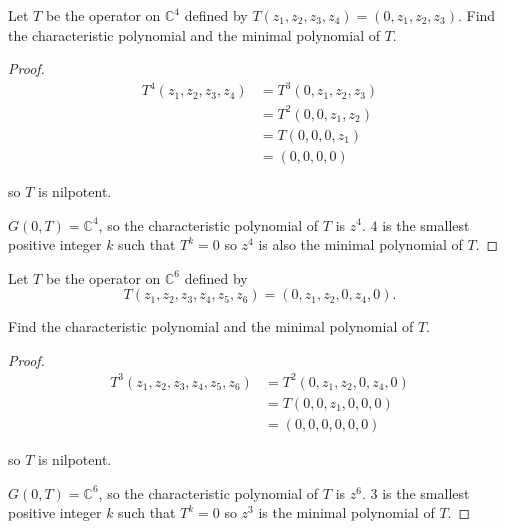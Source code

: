 \begin{exercise}\label{chapter8:sectionB:exercise15}
    Let $T$ be the operator on $\mathbb{C}^{4}$ defined by $T(z_{1}, z_{2}, z_{3}, z_{4}) = (0, z_{1}, z_{2}, z_{3})$. Find the characteristic polynomial and the minimal polynomial of $T$.
\end{exercise}

\begin{proof}
    \begin{align*}
        T^{4}(z_{1}, z_{2}, z_{3}, z_{4}) & = T^{3}(0, z_{1}, z_{2}, z_{3}) \\
                                          & = T^{2}(0, 0, z_{1}, z_{2})     \\
                                          & = T(0, 0, 0, z_{1})             \\
                                          & = (0, 0, 0, 0)
    \end{align*}

    so $T$ is nilpotent.

    $G(0, T) = \mathbb{C}^{4}$, so the characteristic polynomial of $T$ is $z^{4}$. $4$ is the smallest positive integer $k$ such that $T^{k} = 0$ so $z^{4}$ is also the minimal polynomial of $T$.
\end{proof}
\newpage

\begin{exercise}\label{chapter8:sectionB:exercise16}
    Let $T$ be the operator on $\mathbb{C}^{6}$ defined by
    \[
        T(z_{1}, z_{2}, z_{3}, z_{4}, z_{5}, z_{6}) = (0, z_{1}, z_{2}, 0, z_{4}, 0).
    \]

    Find the characteristic polynomial and the minimal polynomial of $T$.
\end{exercise}

\begin{proof}
    \begin{align*}
        T^{3}(z_{1}, z_{2}, z_{3}, z_{4}, z_{5}, z_{6}) & = T^{2}(0, z_{1}, z_{2}, 0, z_{4}, 0) \\
                                                        & = T(0, 0, z_{1}, 0, 0, 0)             \\
                                                        & = (0, 0, 0, 0, 0, 0)
    \end{align*}

    so $T$ is nilpotent.

    $G(0, T) = \mathbb{C}^{6}$, so the characteristic polynomial of $T$ is $z^{6}$. $3$ is the smallest positive integer $k$ such that $T^{k} = 0$ so $z^{3}$ is the minimal polynomial of $T$.
\end{proof}
\newpage

